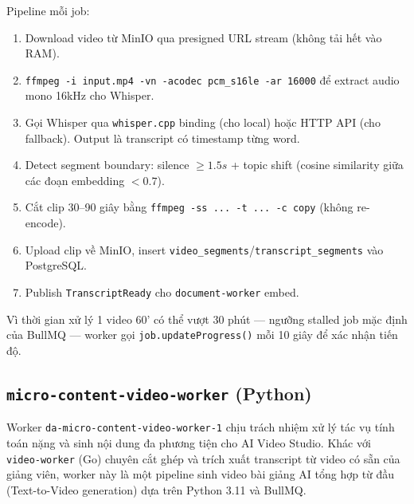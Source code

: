Pipeline mỗi job:

\begin{enumerate}
    \item Download video từ MinIO qua presigned URL stream (không tải
          hết vào RAM).
    \item \texttt{ffmpeg -i input.mp4 -vn -acodec pcm\_s16le -ar 16000}
          để extract audio mono 16kHz cho Whisper.
    \item Gọi Whisper qua \texttt{whisper.cpp} binding (cho local) hoặc
          HTTP API (cho fallback). Output là transcript có timestamp
          từng word.
    \item Detect segment boundary: silence $\geq 1.5s$ + topic shift
          (cosine similarity giữa các đoạn embedding $< 0.7$).
    \item Cắt clip 30--90 giây bằng \texttt{ffmpeg -ss ... -t ... -c
          copy} (không re-encode).
    \item Upload clip về MinIO, insert
          \texttt{video\_segments}/\texttt{transcript\_segments} vào
          PostgreSQL.
    \item Publish \texttt{TranscriptReady} cho
          \texttt{document-worker} embed.
\end{enumerate}

Vì thời gian xử lý 1 video 60' có thể vượt 30 phút --- ngưỡng stalled
job mặc định của BullMQ --- worker gọi \texttt{job.updateProgress()}
mỗi 10 giây để xác nhận tiến độ.

\subsection{\texttt{micro-content-video-worker} (Python)}
\label{subsec:micro-content-video-worker}

Worker \texttt{da-micro-content-video-worker-1} chịu trách nhiệm xử lý tác vụ tính toán nặng và sinh nội dung đa phương tiện cho AI Video Studio. Khác với \texttt{video-worker} (Go) chuyên cắt ghép và trích xuất transcript từ video có sẵn của giảng viên, worker này là một pipeline sinh video bài giảng AI tổng hợp từ đầu (Text-to-Video generation) dựa trên Python 3.11 và BullMQ.

